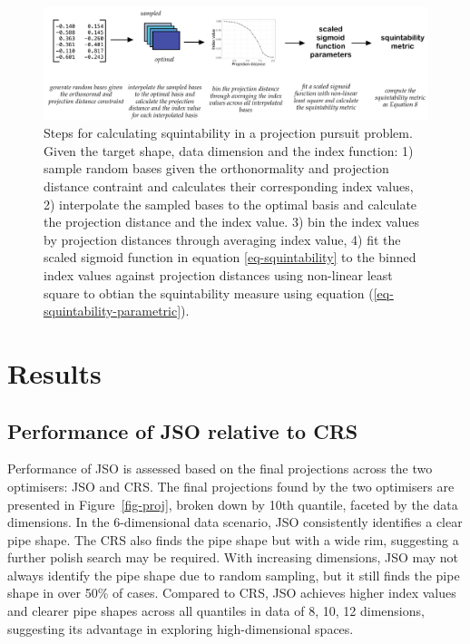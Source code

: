 \documentclass[
  12pt,
]{interact}
\theoremstyle{plain}
\begin{document}
\begin{figure}

{\centering \includegraphics[width=1\textwidth,height=\textheight]{figures/squintability.png}

}

\caption{\label{fig-squintability}Steps for calculating squintability in
a projection pursuit problem. Given the target shape, data dimension and
the index function: 1) sample random bases given the orthonormality and
projection distance contraint and calculates their corresponding index
values, 2) interpolate the sampled bases to the optimal basis and
calculate the projection distance and the index value. 3) bin the index
values by projection distances through averaging index value, 4) fit the
scaled sigmoid function in equation \eqref{eq-squintability} to the
binned index values against projection distances using non-linear least
square to obtian the squintability measure using equation
(\ref{eq-squintability-parametric}).}

\end{figure}

\hypertarget{sec-sim-res}{%
\section{Results}\label{sec-sim-res}}

\hypertarget{performance-of-jso-relative-to-crs}{%
\subsection{Performance of JSO relative to
CRS}\label{performance-of-jso-relative-to-crs}}

Performance of JSO is assessed based on the final projections across the
two optimisers: JSO and CRS. The final projections found by the two
optimisers are presented in Figure~\ref{fig-proj}, broken down by 10th
quantile, faceted by the data dimensions. In the 6-dimensional data
scenario, JSO consistently identifies a clear pipe shape. The CRS also
finds the pipe shape but with a wide rim, suggesting a further polish
search may be required. With increasing dimensions, JSO may not always
identify the pipe shape due to random sampling, but it still finds the
pipe shape in over 50\% of cases. Compared to CRS, JSO achieves higher
index values and clearer pipe shapes across all quantiles in data of 8,
10, 12 dimensions, suggesting its advantage in exploring
high-dimensional spaces.
\end{document}
